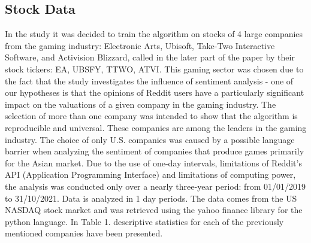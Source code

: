 \documentclass[review]{elsarticle} %
\begin{document}
\subsection{Stock Data}
In the study it was decided to train the algorithm on stocks of 4 large companies from the gaming industry: Electronic Arts, Ubisoft, Take-Two Interactive Software, and Activision Blizzard, called in the later part of the paper by their stock tickers: EA, UBSFY, TTWO, ATVI. This gaming sector was chosen due to the fact that the study investigates the influence of sentiment analysis - one of our hypotheses is that the opinions of Reddit users have a particularly significant impact on the valuations of a given company in the gaming industry.  The selection of more than one company was intended to show that the algorithm is reproducible and universal. These companies are among the leaders in the gaming industry. The choice of only U.S. companies was caused by a possible language barrier when analyzing the sentiment of companies that produce games primarily for the Asian market. Due to the use of one-day intervals, limitations of Reddit's API (Application Programming Interface) and limitations of computing power, the analysis was conducted only over a nearly three-year period: from 01/01/2019 to 31/10/2021. Data is analyzed in 1 day periods. The data comes from the US NASDAQ stock market and was retrieved using the yahoo finance library for the python language. In Table 1. descriptive statistics for each of the previously mentioned companies have been presented. 
\end{document}
